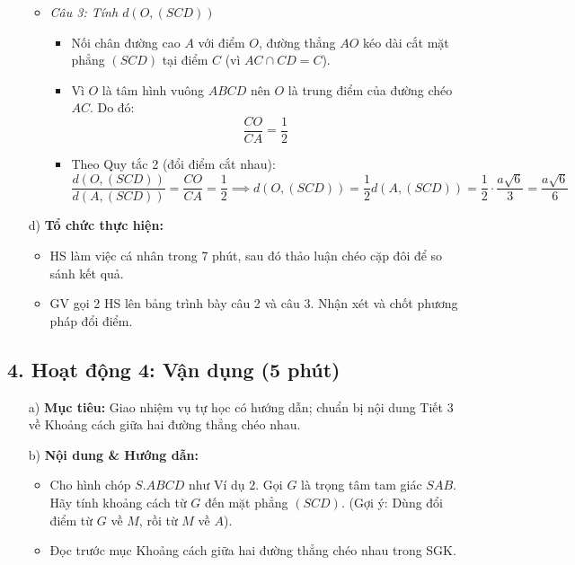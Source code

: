 \documentclass[12pt, a4paper]{article}
\begin{document}
\begin{itemize}[leftmargin=1.2cm]
\begin{itemize}[leftmargin=0.6cm]
        \item \textit{Câu 3: Tính $d(O, (SCD))$}
        \begin{itemize}
            \item Nối chân đường cao $A$ với điểm $O$, đường thẳng $AO$ kéo dài cắt mặt phẳng $(SCD)$ tại điểm $C$ (vì $AC \cap CD = C$).
            \item Vì $O$ là tâm hình vuông $ABCD$ nên $O$ là trung điểm của đường chéo $AC$. Do đó:
            $$\dfrac{CO}{CA} = \dfrac{1}{2}$$
            \item Theo Quy tắc 2 (đổi điểm cắt nhau):
            $$\dfrac{d(O, (SCD))}{d(A, (SCD))} = \dfrac{CO}{CA} = \dfrac{1}{2} \implies d(O, (SCD)) = \dfrac{1}{2} d(A, (SCD)) = \dfrac{1}{2} \cdot \dfrac{a\sqrt{6}}{3} = \dfrac{a\sqrt{6}}{6}$$
        \end{itemize}
    \end{itemize}

    \item[d)] \textbf{Tổ chức thực hiện:}
    \begin{itemize}[leftmargin=0.6cm]
        \item HS làm việc cá nhân trong 7 phút, sau đó thảo luận chéo cặp đôi để so sánh kết quả.
        \item GV gọi 2 HS lên bảng trình bày câu 2 và câu 3. Nhận xét và chốt phương pháp đổi điểm.
    \end{itemize}
\end{itemize}

\subsection*{4. Hoạt động 4: Vận dụng (5 phút)}

\begin{itemize}[leftmargin=1.2cm]
    \item[a)] \textbf{Mục tiêu:} Giao nhiệm vụ tự học có hướng dẫn; chuẩn bị nội dung Tiết 3 về Khoảng cách giữa hai đường thẳng chéo nhau.
    \item[b)] \textbf{Nội dung & Hướng dẫn:}
    \begin{itemize}[leftmargin=0.6cm]
        \item Cho hình chóp $S.ABCD$ như Ví dụ 2. Gọi $G$ là trọng tâm tam giác $SAB$. Hãy tính khoảng cách từ $G$ đến mặt phẳng $(SCD)$. (Gợi ý: Dùng đổi điểm từ $G$ về $M$, rồi từ $M$ về $A$).
        \item Đọc trước mục Khoảng cách giữa hai đường thẳng chéo nhau trong SGK.
    \end{itemize}
\end{itemize}
\end{document}
